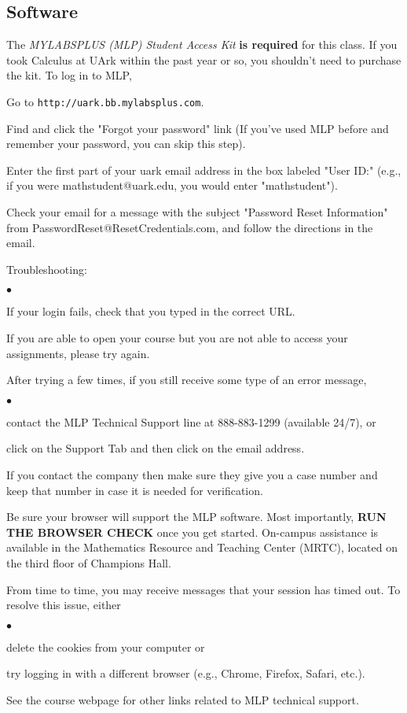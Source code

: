 \documentclass[margin,line,pifont,palatino,courier]{res}
\newenvironment{list1}{
  \begin{list}{\ding{113}}{%
      \setlength{\itemsep}{0in}
      \setlength{\parsep}{0in} \setlength{\parskip}{0in}
      \setlength{\topsep}{0in} \setlength{\partopsep}{0in}
      \setlength{\leftmargin}{0.17in}}}{\end{list}}
\newenvironment{list2}{
  \begin{list}{$\bullet$}{%
      \setlength{\itemsep}{0in}
      \setlength{\parsep}{0in} \setlength{\parskip}{0in}
      \setlength{\topsep}{0in} \setlength{\partopsep}{0in}
      \setlength{\leftmargin}{0.2in}}}{\end{list}}
\begin{document}
\begin{resume}
\section{\sc Software} The \emph{MYLABSPLUS (MLP) Student Access Kit} {\bf is required} for this class. If you took Calculus at UArk within the past year or so, you shouldn't need to purchase the kit. To log in to MLP, 
\begin{list1} 
\item Go to \verb+http://uark.bb.mylabsplus.com+. 
\item Find and click the "Forgot your password" link (If you've used MLP before and remember your password, you can skip this step).
\item Enter the first part of your uark email address in the box labeled "User ID:" (e.g., if you were mathstudent@uark.edu, you would enter "mathstudent").  
\item Check your email for a message with the subject "Password Reset Information" from PasswordReset@ResetCredentials.com, and follow the directions in the email.
\item Troubleshooting: 
	\begin{list2}
	\item If your login fails, check that you typed in the correct URL. 
	\item If you are able to open your course but you are not able to access your assignments, please try again.  
	\item After trying a few times, if you still receive some type of an error message,
		\begin{list2}
		\item contact the MLP Technical Support line at 888-883-1299 (available 24/7), or 
		\item click on the Support Tab and then click on the email address. 
		\end{list2}
	\item If you contact the company then make sure they give you a case number and keep that number in case it is needed for verification. 
	\end{list2}
\item Be sure your browser will support the MLP software.  Most importantly, {\bf RUN THE BROWSER CHECK} once you get started. On-campus assistance is available in the Mathematics Resource and Teaching Center (MRTC), located on the third floor of Champions Hall.  
\item From time to time, you may receive messages that your session has timed out. To resolve this issue, either 
	\begin{list2}
	\item delete the cookies from your computer or 
	\item try logging in with a different browser (e.g., Chrome, Firefox, Safari, etc.).
	\end{list2}
\item See the course webpage for other links related to MLP technical support.	
\end{list1}


\end{resume}
\end{document}
